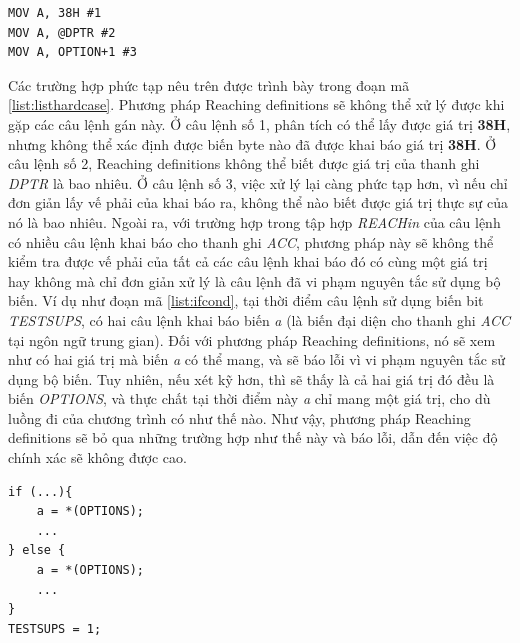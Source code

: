 \begin{lstlisting}[caption={Một số câu lệnh gán mà phương pháp Suy luận kiểu sử dụng Reaching definitions không xử lý được},label={list:listhardcase}]
MOV A, 38H #1
MOV A, @DPTR #2
MOV A, OPTION+1 #3
\end{lstlisting}
Các trường hợp phức tạp nêu trên được trình bày trong đoạn mã \ref{list:listhardcase}. 
Phương pháp Reaching definitions sẽ không thể xử lý được khi gặp các câu lệnh gán này. Ở câu lệnh số 1, phân tích có thể lấy được giá trị \textbf{38H}, nhưng không thể xác định được biến byte nào đã được khai báo giá trị \textbf{38H}. Ở câu lệnh số 2, Reaching definitions không thể biết được giá trị của thanh ghi \textit{DPTR} là bao nhiêu. Ở câu lệnh số 3, việc xử lý lại càng phức tạp hơn, vì nếu chỉ đơn giản lấy vế phải của khai báo ra, không thể nào biết được giá trị thực sự của nó là bao nhiêu.
Ngoài ra, với trường hợp trong tập hợp \textit{REACHin} của câu lệnh có nhiều câu lệnh khai báo cho thanh ghi \textit{ACC}, phương pháp này sẽ không thể kiểm tra được vế phải của tất cả các câu lệnh khai báo đó có cùng một giá trị hay không mà chỉ đơn giản xử lý là câu lệnh đã vi phạm nguyên tắc sử dụng bộ biến. Ví dụ như đoạn mã \ref{list:ifcond}, tại thời điểm câu lệnh sử dụng biến bit \textit{TESTSUPS}, có hai câu lệnh khai báo biến \textit{a} (là biến đại diện cho thanh ghi \textit{ACC} tại ngôn ngữ trung gian). Đối với phương pháp Reaching definitions, nó sẽ xem như có hai giá trị mà biến \textit{a} có thể mang, và sẽ báo lỗi vì vi phạm nguyên tắc sử dụng bộ biến. Tuy nhiên, nếu xét kỹ hơn, thì sẽ thấy là cả hai giá trị đó đều là biến \textit{OPTIONS}, và thực chất tại thời điểm này \textit{a} chỉ mang một giá trị, cho dù luồng đi của chương trình có như thế nào. Như vậy, phương pháp Reaching definitions sẽ bỏ qua những trường hợp như thế này và báo lỗi, dẫn đến việc độ chính xác sẽ không được cao.
\begin{lstlisting}[caption={Đoạn mã có nhiều câu lệnh khai báo cho ACC đến được một điểm của chương trình nhưng tất cả đều cùng giá trị},label={list:ifcond}]
if (...){
	a = *(OPTIONS);
	...
} else {
	a = *(OPTIONS);
	...
}
TESTSUPS = 1;
\end{lstlisting}

